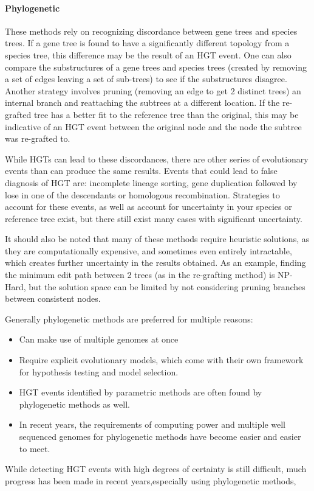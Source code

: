 \documentclass[12pt,letter]{article}
\begin{document}
\paragraph{Phylogenetic}
These methods rely on recognizing discordance between gene trees and species trees.
If a gene tree is found to have a significantly different topology from a species tree, this difference may be the result of an HGT event.
One can also compare the substructures of a gene trees and species trees (created by removing a set of edges leaving a set of sub-trees) to see if the substructures disagree.
Another strategy involves pruning (removing an edge to get 2 distinct trees) an internal branch and reattaching the subtrees at a different location.
If the re-grafted tree has a better fit to the reference tree than the original, this may be indicative of an HGT event between the original node and the node the subtree was re-grafted to.\par
While HGTs can lead to these discordances, there are other series of evolutionary events than can produce the same results.
Events that could lead to false diagnosis of HGT are: incomplete lineage sorting, gene duplication followed by lose in one of the descendants or homologous recombination.
Strategies to account for these events, as well as account for uncertainty in your species or reference tree exist, but there still exist many cases with significant uncertainty.\par
It should also be noted that many of these methods require heuristic solutions, as they are computationally expensive, and sometimes even entirely intractable, which creates further uncertainty in the results obtained.
As an example, finding the minimum edit path between 2 trees (as in the re-grafting method) is NP-Hard, but the solution space can be limited by not considering pruning branches between consistent nodes\citep{sprnp,ihgt}.\par\par
Generally phylogenetic methods are preferred for multiple reasons:
\begin{itemize}
    \item Can make use of multiple genomes at once
    \item Require explicit evolutionary models, which come with their own framework for hypothesis testing and model selection.
    \item HGT events identified by parametric methods are often found by phylogenetic methods as well.
    \item In recent years, the requirements of computing power and  multiple well sequenced genomes for phylogenetic methods have become easier and easier to meet.
\end{itemize}
While detecting HGT events with high degrees of certainty is still difficult, much progress has been made in recent years,especially using phylogenetic methods,
\end{document}

